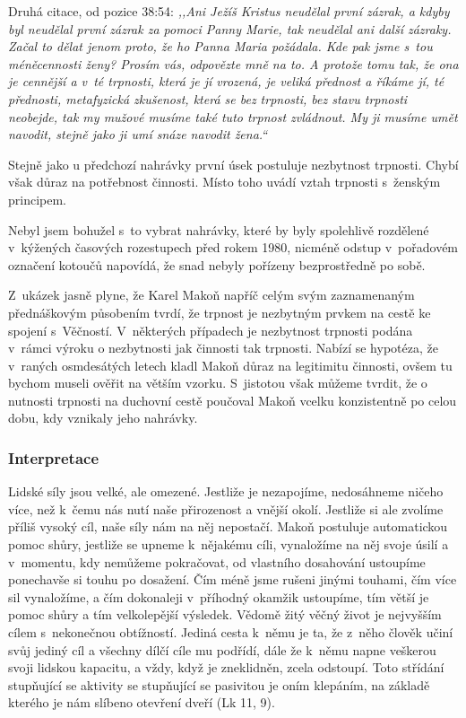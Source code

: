 \begin{enumerate}
{      Druhá citace, od pozice 38:54: \textit{%
        ,,Ani Ježíš Kristus neudělal první zázrak, a kdyby byl neudělal první
        zázrak za pomoci Panny Marie, tak neudělal ani další zázraky. Začal to
        dělat jenom proto, že ho Panna Maria požádala. Kde pak jsme s~tou
        méněcennosti ženy? Prosím vás, odpovězte mně na to. A protože tomu tak,
        že ona je cennější a v~té trpnosti, která je jí vrozená, je veliká
        přednost a říkáme jí, té přednosti, metafyzická zkušenost, která se bez
        trpnosti, bez stavu trpnosti neobejde, tak my mužové musíme také tuto
        trpnost zvládnout. My ji musíme umět navodit, stejně jako ji umí snáze
        navodit žena.``
      }

      Stejně jako u předchozí nahrávky první úsek postuluje nezbytnost trpnosti.
      Chybí však důraz na potřebnost činnosti. Místo toho uvádí vztah trpnosti
      s~ženským principem.
  }
\end{enumerate}

Nebyl jsem bohužel s~to vybrat nahrávky, které by byly spolehlivě rozdělené
v~kýžených časových rozestupech před rokem 1980, nicméně odstup v~pořadovém
označení kotoučů napovídá, že snad nebyly pořízeny bezprostředně po sobě.

Z~ukázek jasně plyne, že Karel Makoň napříč celým svým zaznamenaným přednáškovým
působením tvrdí, že trpnost je nezbytným prvkem na cestě ke spojení s~Věčností.
V~některých případech je nezbytnost trpnosti podána v~rámci výroku o nezbytnosti
jak činnosti tak trpnosti. Nabízí se hypotéza, že v~raných osmdesátých letech
kladl Makoň důraz na legitimitu činnosti, ovšem tu bychom museli ověřit na
větším vzorku. S~jistotou však můžeme tvrdit, že o nutnosti trpnosti na duchovní
cestě poučoval Makoň vcelku konzistentně po celou dobu, kdy vznikaly jeho nahrávky.

\subsubsection*{Interpretace}

Lidské síly jsou velké, ale omezené. Jestliže je nezapojíme, nedosáhneme ničeho
více, než k~čemu nás nutí naše přirozenost a vnější okolí. Jestliže si ale
zvolíme příliš vysoký cíl, naše síly nám na něj nepostačí. Makoň postuluje
automatickou pomoc shůry, jestliže se upneme k~nějakému cíli, vynaložíme na něj
svoje úsilí a v~momentu, kdy nemůžeme pokračovat, od vlastního dosahování
ustoupíme ponechavše si touhu po dosažení. Čím méně jsme rušeni jinými touhami,
čím více sil vynaložíme, a čím dokonaleji v~příhodný okamžik ustoupíme, tím
větší je pomoc shůry a tím velkolepější výsledek. Vědomě žitý věčný život je
nejvyšším cílem s~nekonečnou obtížností. Jediná cesta k~němu je ta, že z~něho
člověk učiní svůj jediný cíl a všechny dílčí cíle mu podřídí, dále že k~němu
napne veškerou svoji lidskou kapacitu, a vždy, když je zneklidněn, zcela
odstoupí. Toto střídání stupňující se aktivity se stupňující se pasivitou je
oním klepáním, na základě kterého je nám slíbeno otevření dveří (Lk 11, 9).

